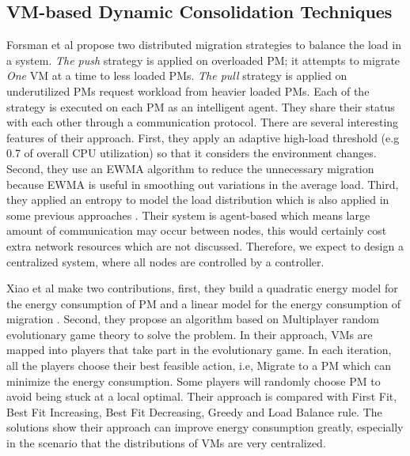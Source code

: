 
\subsection{VM-based Dynamic Consolidation Techniques}
\label{sec:dynamic}

Forsman et al \cite{Forsman:2015ca} propose two distributed migration strategies to balance the load in a system. \emph{The push} strategy is applied on overloaded PM; it attempts to migrate \emph{One} VM at a time to less loaded PMs. \emph{The pull} strategy is applied on underutilized PMs request workload from heavier loaded PMs. Each of the strategy is executed on each PM as an intelligent agent. They share their status with each other through a communication protocol. There are several interesting features of their approach. First, they apply an adaptive high-load threshold (e.g 0.7 of overall CPU utilization) so that it considers the environment changes. Second, they use an EWMA algorithm to reduce the unnecessary migration because EWMA \cite{Holt:2004fs} is useful in smoothing out variations in the average load. Third, they applied an entropy to model the load distribution which is also applied in some previous approaches \cite{Qin:2012wu,Kunkle:2008bz}. Their system is agent-based which means large amount of communication may occur between nodes, this would certainly cost extra network resources which are not discussed. Therefore, we expect to design a centralized system, where all nodes are controlled by a controller. 

Xiao et al \cite{Xiao:2015ik} make two contributions, first, they build a quadratic energy model for the energy consumption of PM and a linear model for the energy consumption of migration \cite{Liu:2013kl}. Second, they propose an algorithm based on Multiplayer random evolutionary game theory to solve the problem. In their approach, VMs are mapped into players that take part in the evolutionary game. In each iteration, all the players choose their best feasible action, i.e, Migrate to a PM which can minimize the energy consumption. Some players will randomly choose PM to avoid being stuck at a local optimal. Their approach is compared with First Fit, Best Fit Increasing, Best Fit Decreasing, Greedy and Load Balance rule. The solutions show their approach can improve energy consumption greatly, especially in the scenario that the distributions of VMs are very centralized.




